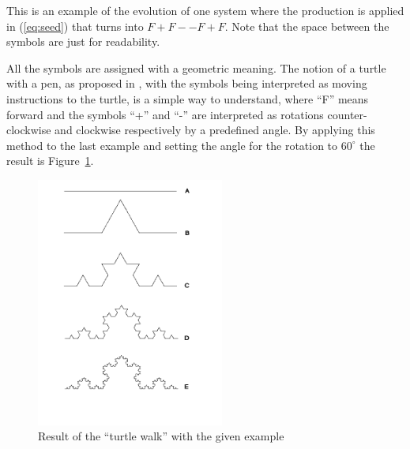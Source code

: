 
This is an example of the evolution of one system where the production is applied  in (\ref{eq:seed}) that turns into $F+F--F+F$. Note that the space
between the symbols are just for readability.

All the symbols are assigned with a geometric meaning. The notion of a turtle with a pen, as proposed in \cite{abelson1982aa}, with the symbols being
interpreted as moving instructions to the turtle, is a simple way to understand, where ``F'' means forward and the symbols ``+'' and ``-'' are interpreted as rotations counter-clockwise and clockwise respectively by a predefined angle. By applying this method to the last example and setting the angle for the rotation to $60^{\circ}$ the result is Figure~\ref{fig:kockLS}.

\begin{figure}[htbp]
   \centering
   \includegraphics[width=0.55\textwidth]{img/Theory/L_Systems/koch.png}
   \caption{Result of the ``turtle walk'' with the given example}
   \label{fig:kockLS}
\end{figure}









